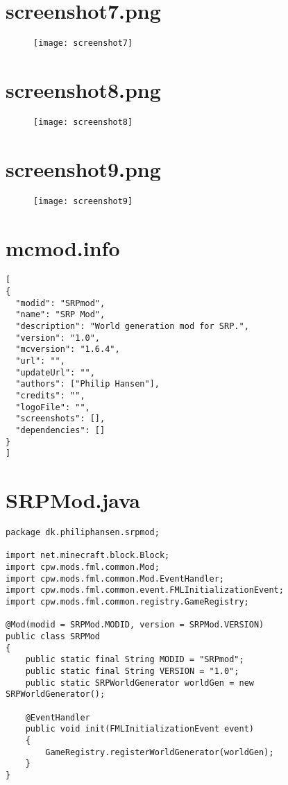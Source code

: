 \documentclass[a4paper,12pt]{report}
\begin{document}
		\chapter{screenshot7.png}
		\label{appendixI}
			\begin{figure}
				\begin{center}
				\texttt{[image: screenshot7]}
				\end{center}
			\end{figure}
		\chapter{screenshot8.png}
		\label{appendixJ}
			\begin{figure}
				\begin{center}
				\texttt{[image: screenshot8]}
				\end{center}
			\end{figure}
		\chapter{screenshot9.png}
		\label{appendixK}
			\begin{figure}
				\begin{center}
				\texttt{[image: screenshot9]}
				\end{center}
			\end{figure}
		\chapter{mcmod.info}
		\label{appendixL}
\begin{lstlisting}[label=mcmod.info,caption=mcmod.info]
[
{
  "modid": "SRPmod",
  "name": "SRP Mod",
  "description": "World generation mod for SRP.",
  "version": "1.0",
  "mcversion": "1.6.4",
  "url": "",
  "updateUrl": "",
  "authors": ["Philip Hansen"],
  "credits": "",
  "logoFile": "",
  "screenshots": [],
  "dependencies": []
}
]
\end{lstlisting}
		\chapter{SRPMod.java}
		\label{appendixM}
\begin{lstlisting}[label=SRPMod.java,caption=SRPMod.java]
package dk.philiphansen.srpmod;

import net.minecraft.block.Block;
import cpw.mods.fml.common.Mod;
import cpw.mods.fml.common.Mod.EventHandler;
import cpw.mods.fml.common.event.FMLInitializationEvent;
import cpw.mods.fml.common.registry.GameRegistry;

@Mod(modid = SRPMod.MODID, version = SRPMod.VERSION)
public class SRPMod
{
    public static final String MODID = "SRPmod";
    public static final String VERSION = "1.0";
    public static SRPWorldGenerator worldGen = new SRPWorldGenerator();
    
    @EventHandler
    public void init(FMLInitializationEvent event)
    {
		GameRegistry.registerWorldGenerator(worldGen);
    }
}
\end{lstlisting}
\end{document}
